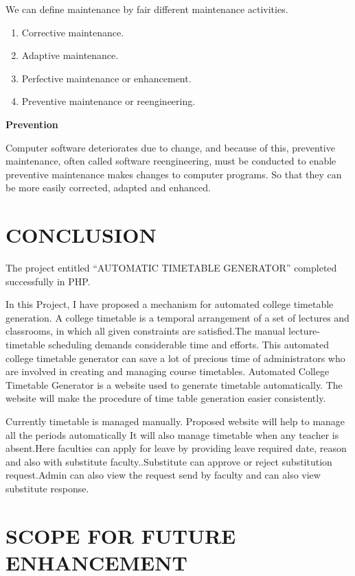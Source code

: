 We can define maintenance by fair different maintenance activities.
\begin {enumerate}
\item Corrective maintenance.
\item Adaptive maintenance.
\item Perfective maintenance or enhancement.
\item Preventive maintenance or reengineering.
\end{enumerate}

{\bf Prevention}

Computer software deteriorates due to change, and because of this, preventive maintenance, often called software reengineering, must be conducted to enable preventive maintenance makes changes to computer programs. So that they can be more easily corrected, adapted and enhanced.

  

%
%
%
%
\chapter{CONCLUSION}

The project entitled “AUTOMATIC TIMETABLE GENERATOR” completed successfully in PHP.


                In this Project, I have proposed a mechanism for automated college timetable generation. A college timetable is a temporal arrangement of a set of lectures and classrooms, in which all given constraints are satisfied.The manual lecture- timetable scheduling demands considerable time and efforts. This automated college timetable generator can save a lot of precious time of administrators who are involved in creating and managing course timetables. Automated College Timetable Generator is a website used to generate timetable automatically. The website will make the procedure of time table generation easier consistently.


                Currently timetable is managed manually. Proposed website will help to manage all the periods automatically It will also manage timetable when any teacher is absent.Here faculties can apply for leave by providing leave required date, reason and also with substitute faculty..Substitute can approve or reject substitution request.Admin can also view the request send by faculty and can also view substitute response.

%
\chapter{SCOPE FOR FUTURE ENHANCEMENT}

